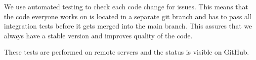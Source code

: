 We use automated testing to check each code change for issues. This means that the code everyone works on is located in a separate git branch \cite{gitbranch} and has to pass all integration tests before it gets merged into the main branch. This assures that we always have a stable version and improves quality of the code.  

These tests are performed on remote servers and the status is visible on GitHub. \cite{githubci}  
